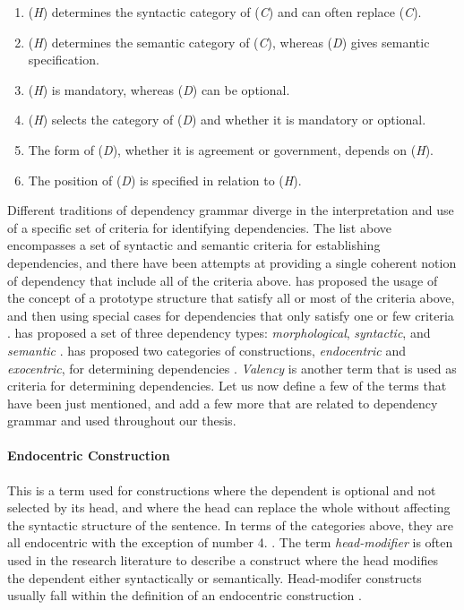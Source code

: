 \begin{enumerate}
\item (\textit{H}) determines the syntactic category of (\textit{C}) and can often replace (\textit{C}).
\item (\textit{H}) determines the semantic category of (\textit{C}), whereas (\textit{D}) gives semantic specification.
\item (\textit{H}) is mandatory, whereas (\textit{D}) can be optional.
\item (\textit{H}) selects the category of (\textit{D}) and whether it is mandatory or optional.
\item The form of (\textit{D}), whether it is agreement or government, depends on (\textit{H}).
\item The position of (\textit{D}) is specified in relation to (\textit{H}).
\end{enumerate}

Different traditions of dependency grammar diverge in the interpretation and use of a specific set of criteria for identifying dependencies. The list above encompasses a set of syntactic and semantic criteria for establishing dependencies, and there have been attempts at providing a single coherent notion of dependency that include all of the criteria above. \citeauthor{Hudson:90} has proposed the usage of the concept of a prototype structure that satisfy all or most of the criteria above, and then using special cases for dependencies that only satisfy one or few criteria \cite{Hudson:90}. \citeauthor{Mel:88} has proposed a set of three dependency types: \textit{morphological}, \textit{syntactic}, and \textit{semantic} \cite{Mel:88}. \citeauthor{Nikula:86} has proposed two categories of constructions, \textit{endocentric} and \textit{exocentric}, for determining dependencies \cite{Nikula:86}. \textit{Valency} is another term that is used as criteria for determining dependencies. Let us now define a few of the terms that have been just mentioned, and add a few more that are related to dependency grammar and used throughout our thesis.

\paragraph{Endocentric Construction} This is a term used for constructions where the dependent is optional and not selected by its head, and where the head can replace the whole without affecting the syntactic structure of the sentence. In terms of the categories above, they are all endocentric with the exception of number 4. \cite{KublerEtAl:09}. The term \textit{head-modifier} is often used in the research literature to describe a construct where the head modifies the dependent either syntactically or semantically. Head-modifer constructs usually fall within the definition of an endocentric construction \cite{Niv:05}.

